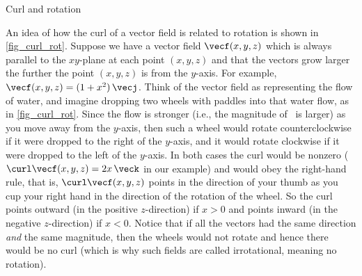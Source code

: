 \noindent\begin{minipage}[t]{\linewidth}\noindent%
\captionsetup{type=figure}%
\centering
{}
\caption{Curl and rotation}\label{fig_curl_rot}
\end{minipage}

An idea of how the curl of a vector field is related to rotation is shown in \autoref{fig_curl_rot}. Suppose we have a vector field $\vecf(x,y,z)$ which is always parallel to the $xy$-plane at each point $(x,y,z)$ and that the vectors grow larger the further the point $(x,y,z)$ is from the $y$-axis. For example, $\vecf(x,y,z) = (1+x^2 )\,\vecj$. Think of the vector field as representing the flow of water, and imagine dropping two wheels with paddles into that water flow, as in \autoref{fig_curl_rot}. Since the flow is stronger (i.e., the magnitude of \vecf\ is larger) as you move away from the $y$-axis, then such a wheel would rotate counterclockwise if it were dropped to the right of the $y$-axis, and it would rotate clockwise if it were dropped to the left of the $y$-axis. In both cases the curl would be nonzero ($\curl\vecf(x,y,z) = 2x\,\veck$ in our example) and would obey the right-hand rule, that is, $\curl\vecf(x,y,z)$ points in the direction of your thumb as you cup your right hand in the direction of the rotation of the wheel. So the curl points outward (in the positive $z$-direction) if $x > 0$ and points inward (in the negative $z$-direction) if $x < 0$. Notice that if all the vectors had the same direction \emph{and} the same magnitude, then the wheels would not rotate and hence there would be no curl (which is why such fields are called irrotational, meaning no rotation).

